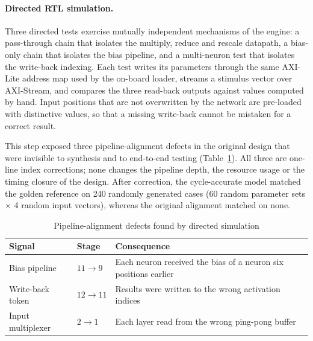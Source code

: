 \documentclass[final,5p,times,twocolumn]{elsarticle}
\begin{document}
\paragraph{Directed RTL simulation.}
Three directed tests exercise mutually independent mechanisms of the engine: a
pass-through chain that isolates the multiply, reduce and rescale datapath, a
bias-only chain that isolates the bias pipeline, and a multi-neuron test that
isolates the write-back indexing. Each test writes its parameters through the
same AXI-Lite address map used by the on-board loader, streams a stimulus vector
over AXI-Stream, and compares the three read-back outputs against values
computed by hand. Input positions that are not overwritten by the network are
pre-loaded with distinctive values, so that a missing write-back cannot be
mistaken for a correct result.

This step exposed three pipeline-alignment defects in the original design that
were invisible to synthesis and to end-to-end testing
(Table~\ref{tab:rtl_defects}). All three are one-line index corrections; none
changes the pipeline depth, the resource usage or the timing closure of the
design. After correction, the cycle-accurate model matched the golden reference
on 240 randomly generated cases (60 random parameter sets $\times$ 4 random
input vectors), whereas the original alignment matched on none.

\begin{table}[htbp]
\centering
\caption{Pipeline-alignment defects found by directed simulation}
\label{tab:rtl_defects}
\small
\begin{tabular}{@{}p{2.0cm}p{1.0cm}p{4.4cm}@{}}
\toprule
Signal & Stage & Consequence \\
\midrule
Bias pipeline & $11\!\rightarrow\!9$ & Each neuron received the bias of a neuron six positions earlier \\
Write-back token & $12\!\rightarrow\!11$ & Results were written to the wrong activation indices \\
Input multiplexer & $2\!\rightarrow\!1$ & Each layer read from the wrong ping-pong buffer \\
\bottomrule
\end{tabular}
\end{table}
\end{document}

